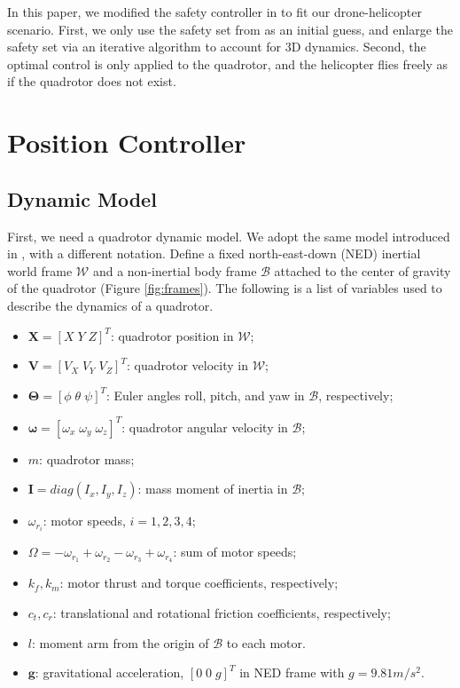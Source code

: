 \documentclass[journal,11pt,onecolumn,draftclsnofoot,]{IEEEtran}
\begin{document}
In this paper, we modified the safety controller in \cite{hoffmann2008decentralized} to fit our drone-helicopter scenario. First, we only use the safety set from \cite{hoffmann2008decentralized} as an initial guess, and enlarge the safety set via an iterative algorithm to account for 3D dynamics. Second, the optimal control is only applied to the quadrotor, and the helicopter flies freely as if the quadrotor does not exist. 

\section{\textbf{Position Controller}}

\subsection{\textbf{Dynamic Model}} \label{sec:dynamic_model}

First, we need a quadrotor dynamic model. We adopt the same model introduced in \cite{bouadi2011adaptive}, with a different notation. Define a fixed north-east-down (NED) inertial world frame $\mathcal{W}$ and a non-inertial body frame $\mathcal{B}$ attached to the center of gravity of the quadrotor (Figure \ref{fig:frames}). The following is a list of variables used to describe the dynamics of a quadrotor.

\begin{itemize}
	\item $\boldsymbol{X}=[X\; Y\; Z]^T$: quadrotor position in $\mathcal{W}$;
	\item $\boldsymbol{V}=[V_X\; V_Y\; V_Z]^T$: quadrotor velocity in $\mathcal{W}$;
	\item $\boldsymbol{\Theta}=[\phi\; \theta\; \psi]^T$: Euler angles roll, pitch, and yaw in $\mathcal{B}$, respectively;
	\item $\boldsymbol{\omega}=[\omega _x\; \omega _y\; \omega _z]^T$: quadrotor angular velocity in $\mathcal{B}$;
	\item $m$: quadrotor mass;
	\item $\boldsymbol{I}=diag(I_x,I_y,I_z)$: mass moment of inertia in $\mathcal{B}$;
	\item $\omega _{r_i}$: motor speeds, $i=1,2,3,4$;
	\item $\Omega=-\omega _{r_1}+\omega _{r_2}-\omega _{r_3}+\omega _{r_4}$: sum of motor speeds;
	\item $k_f, k_m$: motor thrust and torque coefficients, respectively;
	\item $c_t, c_r$: translational and rotational friction coefficients, respectively;
	\item $l$: moment arm from the origin of $\mathcal{B}$ to each motor.
	\item $\boldsymbol{g}$: gravitational acceleration, $[0 \; 0\; g]^T$  in NED frame with $g=9.81m/s^2$.
\end{itemize}
\end{document}
